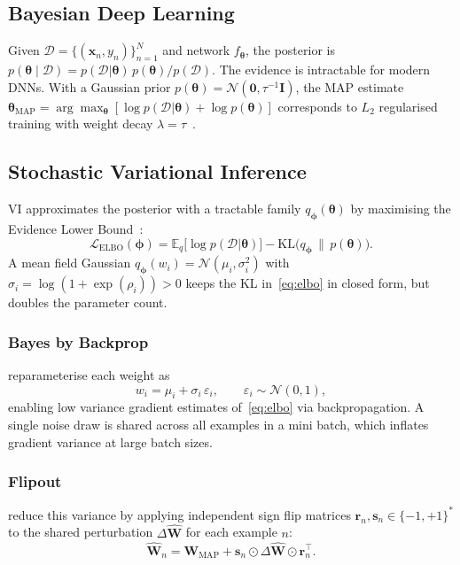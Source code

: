 \documentclass[12pt,a4paper]{article}
\newcommand{\btheta}{\bm{\theta}}
\newcommand{\cD}{\mathcal{D}}
\newcommand{\cN}{\mathcal{N}}
\newcommand{\KL}{\mathrm{KL}}
\newcommand{\ELBO}{\mathcal{L}_{\text{ELBO}}}
\newcommand{\MAP}{\text{MAP}}
\begin{document}
\subsection{Bayesian Deep Learning}

Given $\cD = \{(\bm{x}_n, y_n)\}_{n=1}^{N}$ and network $f_{\btheta}$, the
posterior is $p(\btheta \mid \cD) = p(\cD|\btheta)\,p(\btheta)/p(\cD)$.
The evidence is intractable for modern DNNs. With a Gaussian prior
$p(\btheta)=\cN(\bm{0},\tau^{-1}\mathbf{I})$, the MAP estimate
$\btheta_{\MAP} = \arg\max_{\btheta}[\log p(\cD|\btheta)+\log p(\btheta)]$
corresponds to $L_2$ regularised training with weight decay
$\lambda=\tau$~\citep{murphy2023pml}.

\subsection{Stochastic Variational Inference}

VI approximates the posterior with a tractable family $q_{\bm\phi}(\btheta)$
by maximising the Evidence Lower Bound~\citep{blundell2015weight,goan2020bayesian}:
\begin{equation}
  \ELBO(\bm\phi)
    = \mathbb{E}_{q}\!\bigl[\log p(\cD|\btheta)\bigr]
    - \KL\bigl(q_{\bm\phi}\,\|\,p(\btheta)\bigr).
\label{eq:elbo}
\end{equation}
A mean field Gaussian $q_{\bm\phi}(w_i) = \cN(\mu_i,\sigma_i^2)$ with
$\sigma_i = \log(1+\exp(\rho_i))>0$ keeps the KL in~\eqref{eq:elbo} in
closed form, but doubles the parameter count.

\subsubsection{Bayes by Backprop}

\citet{blundell2015weight} reparameterise each weight as
\begin{equation}
  w_i = \mu_i + \sigma_i\,\varepsilon_i, \qquad \varepsilon_i\sim\cN(0,1),
\end{equation}
enabling low variance gradient estimates of~\eqref{eq:elbo} via
backpropagation.
A single noise draw is shared across all examples in a
mini batch, which inflates gradient variance at large batch sizes.

\subsubsection{Flipout}

\citet{wen2018flipout} reduce this variance by applying independent sign flip
matrices $\mathbf{r}_n,\mathbf{s}_n\in\{-1,+1\}^*$ to the shared
perturbation $\Delta\hat{\mathbf{W}}$ for each example $n$:
\begin{equation}
  \hat{\mathbf{W}}_n
    = \mathbf{W}_{\MAP} + \mathbf{s}_n \odot \Delta\hat{\mathbf{W}}
      \odot \mathbf{r}_n^{\!\top}.
\end{equation}
\end{document}
